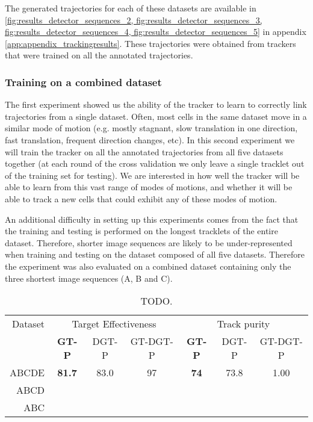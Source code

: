 		The generated trajectories for each of these datasets are available in \cref{fig:results_detector_sequences_2, fig:results_detector_sequences_3, fig:results_detector_sequences_4, fig:results_detector_sequences_5} in appendix \ref{app:appendix_trackingresults}. These trajectories were obtained from trackers that were trained on all the annotated trajectories.
		
		\subsubsection{Training on a combined dataset \statusnew}
		
		The first experiment showed us the ability of the tracker to learn to correctly link trajectories from a single dataset. Often, most cells in the same dataset move in a similar mode of motion (e.g. mostly stagnant, slow translation in one direction, fast translation, frequent direction changes, etc). In this second experiment we will train the tracker on all the annotated trajectories from all five datasets together (at each round of the cross validation we only leave a single tracklet out of the training set for testing). We are interested in how well the tracker will be able to learn from this vast range of modes of motions, and whether it will be able to track a new cells that could exhibit any of these modes of motion.
		
		An additional difficulty in setting up this experiments comes from the fact that the training and testing is performed on the longest tracklets of the entire dataset. Therefore, shorter image sequences are likely to be under-represented when training and testing on the dataset composed of all five datasets. Therefore the experiment was also evaluated on a combined dataset containing only the three shortest image sequences (A, B and C).
		

		\begin{table}[h]
			\centering
			\begin{tabular}{r*{3}{c}*{3}{c}}
				Dataset & \multicolumn{3}{c}{Target Effectiveness} & \multicolumn{3}{c}{Track purity} \\
				        & \textbf{GT-P} & DGT-P &     GT-DGT-P     & \textbf{GT-P} & DGT-P & GT-DGT-P \\
			\hline
				  ABCDE & \textbf{81.7} & 83.0  &        97        &  \textbf{74}  & 73.8  &   1.00   \\
				   ABCD &   \textbf{}   &       &                  &   \textbf{}   &       & \\
				   ABC &   \textbf{}   &       &                  &   \textbf{}   &       &
			\end{tabular} 
			\caption{TODO.}
			\label{tab:results_tracker_combined}
		\end{table}
		
